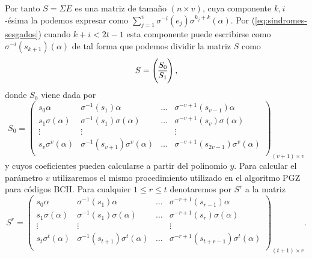 Por tanto \(S = \Sigma E\) es una matriz de tamaño \((n \times v)\), cuya componente \(k, i\)-ésima la podemos expresar como \(\sum_{j=1}^v \sigma^{-i}(e_j)\sigma^{k_j+k}(\alpha)\).
Por (\ref{eq:sindromes-sesgados}) cuando \(k + i < 2t - 1\) esta componente puede escribirse como \(\sigma^{-i}(s_{k+1})(\alpha)\) de tal forma que podemos dividir la matriz \(S\) como
\[
  S = \left( \begin{array}{@{}c@{}}
    S_0\\\hline
    S_1
  \end{array}\right),
\]
donde \(S_0\) viene dada por
\[
  S_0 = \begin{pmatrix}
    s_0\alpha & \sigma^{-1}(s_1)\alpha & \dots & \sigma^{-v+1}(s_{v-1})\alpha\\
    s_1\sigma(\alpha) & \sigma^{-1}(s_1)\sigma(\alpha) & \dots & \sigma^{-v+1}(s_{v})\sigma(\alpha)\\
    \vdots & \vdots & & \vdots \\
    s_v\sigma^v(\alpha) & \sigma^{-1}(s_{v+1})\sigma^v(\alpha) & \dots & \sigma^{-v+1}(s_{2v-1})\sigma^v(\alpha)\\
  \end{pmatrix}_{(v + 1) \times v}
\]
y cuyos coeficientes pueden calcularse a partir del polinomio \(y\).
Para calcular el parámetro \(v\) utilizaremos el mismo procedimiento utilizado en el algoritmo PGZ para códigos BCH.
Para cualquier \(1 \leq r \leq t\) denotaremos por \(S^r\) a la matriz
\[
  S^r = \begin{pmatrix}
    s_0\alpha & \sigma^{-1}(s_1)\alpha & \dots & \sigma^{-r+1}(s_{r-1})\alpha\\
    s_1\sigma(\alpha) & \sigma^{-1}(s_1)\sigma(\alpha) & \dots & \sigma^{-r+1}(s_{r})\sigma(\alpha)\\
    \vdots & \vdots & & \vdots \\
    s_t\sigma^t(\alpha) & \sigma^{-1}(s_{t+1})\sigma^t(\alpha) & \dots & \sigma^{-r+1}(s_{t+r-1})\sigma^t(\alpha)\\
  \end{pmatrix}_{(t + 1) \times r}.
\]

